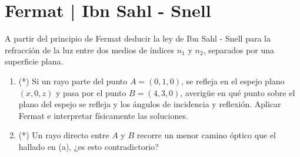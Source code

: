 \section*{Fermat | Ibn Sahl - Snell}

\item
A partir del principio de Fermat deducir la ley de Ibn Sahl - Snell para la refracción de la luz entre dos medios de índices $n_1$ y $n_2$, separados por una superficie plana.


\item
\begin{enumerate}
	\item (*) Si un rayo parte del punto $A=(0,1,0)$, se refleja en el espejo plano $(x,0,z)$ y pasa por el punto $B=(4,3,0)$, averigüe en qué punto sobre el plano del espejo se refleja y los ángulos de incidencia y reflexión.
	Aplicar Fermat e interpretar físicamente las soluciones. 
	\item (*) Un rayo directo entre $A$ y $B$ recorre un menor camino óptico que el hallado en (a), ¿es esto contradictorio?
\end{enumerate}



